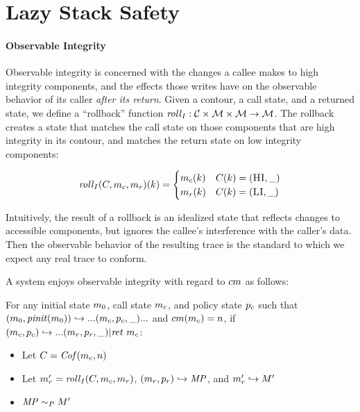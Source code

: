 \documentclass[acmsmall,review,anonymous]{acmart}\settopmatter{printfolios=true,printccs=false,printacmref=false}
\begin{document}

\section{Lazy Stack Safety}

    \paragraph{Observable Integrity}

      Observable integrity is concerned with the changes a callee makes to high integrity components,
      and the effects those writes have on the observable behavior of its caller
      {\it after its return}. Given a contour, a call state, and a returned state, we define
      a ``rollback'' function \(\mathit{roll}_I : {\mathcal C} \times {\mathcal M} \times {\mathcal M}
      \rightarrow {\mathcal M}\). The rollback creates a state that matches the call
      state on those components that are high integrity in its contour, and matches the return state
      on low integrity components:

      \[\mathit{roll}_I(C,m_c,m_r)(k) =
      \begin{cases}
        m_c(k) & C(k) = (\textsc{HI},\_) \\
        m_r(k) & C(k) = (\textsc{LI},\_) \\
      \end{cases}\]

      Intuitively, the result of a rollback is an idealized state that reflects changes to accessible
      components, but ignores the callee's interference with the caller's data. Then the observable
      behavior of the resulting trace is the standard to which we expect any real trace to conform.

      A system enjoys observable integrity with regard to \(cm\) as follows:

      For any initial state \(m_0\), call state \(m_c\), and policy state \(p_c\) such that
      \((m_0,\mathit{pinit}(m_0)) \hookrightarrow ... (m_c,p_c,\_) ...\)
      and \(cm(m_c) = n\), if \((m_c,p_c) \hookrightarrow ...
        (m_r,p_r,\_) | \mathit{ret}\ m_c\):

          \begin{itemize}
            \item Let \(C = \mathit{Cof}(m_c,n)\)
            \item Let \(m_r' = \mathit{roll}_I(C,m_c,m_r)\), \((m_r,p_r)
              \hookrightarrow \mathit{MP}\), and \(m_r' \hookrightarrow M'\)
            \item \(\mathit{MP} \sim_P M'\)
          \end{itemize}
    
\end{document}
